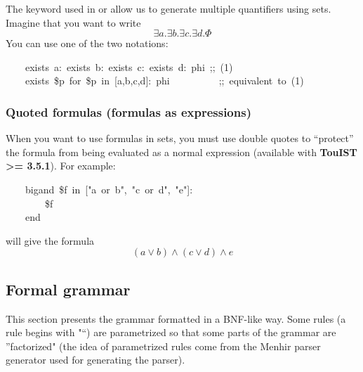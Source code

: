 \noindent The keyword  used in  or  allow us to generate
multiple quantifiers using sets. Imagine that you want to write%
\noindent\noindent\[\exists a. \exists b. \exists c. \exists d. \Phi
\]%
\noindent You can use one of the two notations:
\begin{mdpre}%
\noindent~~~~{exists}~a:~{exists}~b:~{exists}~c:~{exists}~d:~phi~{;;~(1)}\\
~~~~{exists}~{\$p}~{for}~{\$p}~{in}~{}[a,b,c,d]:~phi~~~~~~~~~~{;;~equivalent~to~(1)}%
\end{mdpre}
\subsubsection{Quoted formulas (formulas as expressions)}\label{quoted-formulas}%

\noindent When you want to use formulas in sets, you must use double quotes 
to \textquotedblleft{}protect\textquotedblright{} the formula from being evaluated as a normal expression
(available with \textbf{TouIST \textgreater{}= 3.5.1}). For example:%
\begin{mdpre}%
\noindent~~~~{bigand}~{\$f}~{in}~{}["a~or~b",~"c~or~d",~"e"]:\\
~~~~~~~~{\$f}\\
~~~~{end}%
\end{mdpre}\noindent will give the formula
\noindent\noindent\[(a \vee b) \wedge (c \vee d) \wedge e
\]%

\subsection{Formal grammar}\label{sec-formal-grammar}%

\noindent This section presents the grammar formatted in a BNF-like way. Some rules
(a rule begins with "\mdcode{::=}\textquotedblleft{}) are parametrized so that some parts of the
grammar are \textquotedblright{}factorized" (the idea of parametrized rules come from the
Menhir parser generator used for generating the \touist parser).%

